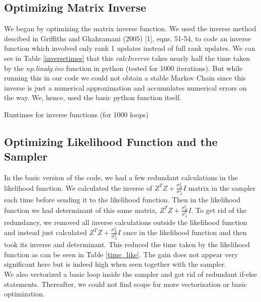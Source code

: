 \documentclass[11pt]{article}
\begin{document}

\subsection{Optimizing Matrix Inverse}
We began by optimizing the matrix inverse function. We used the inverse method descibed in Griffiths and Ghahramani (2005) [1], eqns. 51-54, to code an inverse function which involved only rank 1 updates instead of full rank updates. We can see in Table \ref{inversetimes} that this \textit{calcInverse} takes nearly half the time taken by the \textit{np.linalg.inv} function in python (tested for 1000 iterations). But while running this in our code we could not obtain a stable Markov Chain since this inverse is just a numerical approximation and accumulates numerical errors on the way. We, hence, used the basic python function itself.\\

\begin{table}[ht]
\centering
\caption{Runtimes for inverse functions (for 1000 loops) \label{inversetimes}}

\end{table}

\subsection{Optimizing Likelihood Function and the Sampler}
In the basic version of the code, we had a few redundant calculations in the likelihood function. We calculated the inverse of $Z^TZ+\frac{\sigma_X^2}{\sigma_A^2}I$ matrix in the sampler each time before sending it to the likelihood function. Then in the likelihood function we had determinant of this same matrix, $Z^TZ+\frac{\sigma_X^2}{\sigma_A^2}I$. To get rid of the redundancy, we removed all inverse calculations outside the likelihood function and instead just calculated $Z^TZ+\frac{\sigma_X^2}{\sigma_A^2}I$ once in the likelihood function and then took its inverse and determinant. This reduced the time taken by the likelihood function as can be seen in Table \ref{time_like}. The gain does not appear very significant here but is indeed high when seen together with the sampler.\\

We also vectorized a basic loop inside the sampler and got rid of redundant if-else statements. Thereafter, we could not find scope for more vectorization or basic optimization.\\
\end{document}
